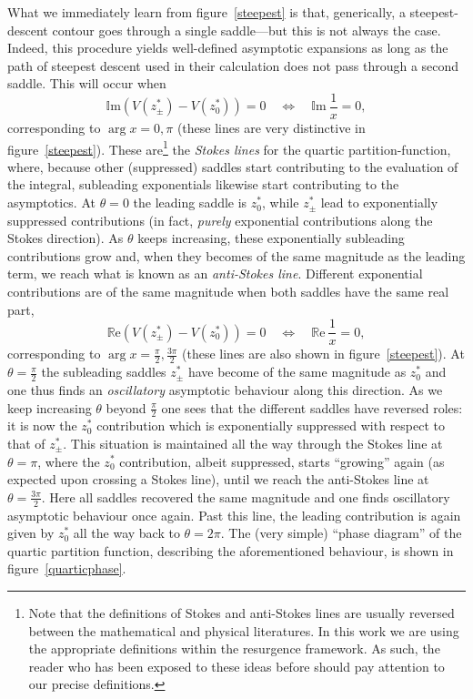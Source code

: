 \documentclass[11pt,a4paper]{article}
\newcommand{\be}{\begin{equation}}
\newcommand{\ee}{\end{equation}}
\def\im{{\mathbb{I}}{\mathrm{m}}}
\def\re{{\mathbb{R}}{\mathrm{e}}}
\begin{document}
What we immediately learn from figure~\ref{steepest} is that, generically, a steepest-descent contour goes through a single saddle---but this is not always the case. Indeed, this procedure yields well-defined asymptotic expansions as long as the path of steepest descent used in their calculation does not pass through a second saddle. This will occur when
%
\be
\im \left( V(z^*_{\pm}) - V(z^*_0) \right) = 0 \quad \Leftrightarrow \quad \im\ \frac{1}{x} = 0,
\ee
%
\noindent
corresponding to $\arg x = 0, \pi$ (these lines are very distinctive in figure~\ref{steepest}). These are\footnote{Note that the definitions of Stokes and anti-Stokes lines are usually reversed between the mathematical and physical literatures. In this work we are using the appropriate definitions within the resurgence framework. As such, the reader who has been exposed to these ideas before should pay attention to our precise definitions.} the \textit{Stokes lines} for the quartic partition-function, where, because other (suppressed) saddles start contributing to the evaluation of the integral, subleading exponentials likewise start contributing to the asymptotics. At $\theta=0$ the leading saddle is $z^*_0$, while $z^*_{\pm}$ lead to exponentially suppressed contributions (in fact, \textit{purely} exponential contributions along the Stokes direction). As $\theta$ keeps increasing, these exponentially subleading contributions grow and, when they becomes of the same magnitude as the leading term, we reach what is known as an \textit{anti-Stokes line}. Different exponential contributions are of the same magnitude when both saddles have the same real part,
%
\be
\re \left( V(z^*_{\pm}) - V(z^*_0) \right) = 0 \quad \Leftrightarrow \quad \re\ \frac{1}{x} = 0,
\ee
%
\noindent
corresponding to $\arg x = \frac{\pi}{2}, \frac{3\pi}{2}$ (these lines are also shown in figure~\ref{steepest}). At $\theta=\frac{\pi}{2}$ the subleading saddles $z^*_{\pm}$ have become of the same magnitude as $z^*_0$ and one thus finds an \textit{oscillatory} asymptotic behaviour along this direction. As we keep increasing $\theta$ beyond $\frac{\pi}{2}$ one sees that the different saddles have reversed roles: it is now the $z^*_0$ contribution which is exponentially suppressed with respect to that of $z^*_{\pm}$. This situation is maintained all the way through the Stokes line at $\theta=\pi$, where the $z^*_0$ contribution, albeit suppressed, starts ``growing'' again (as expected upon crossing a Stokes line), until we reach the anti-Stokes line at $\theta=\frac{3\pi}{2}$. Here all saddles recovered the same magnitude and one finds oscillatory asymptotic behaviour once again. Past this line, the leading contribution is again given by $z^*_0$ all the way back to $\theta=2\pi$. The (very simple) ``phase diagram'' of the quartic partition function, describing the aforementioned behaviour, is shown in figure~\ref{quarticphase}.
\end{document}
